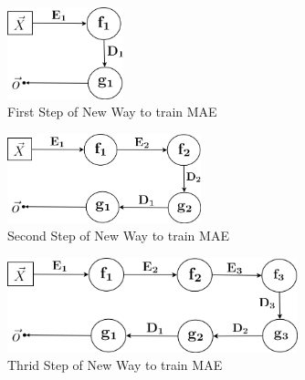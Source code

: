 \documentclass[draft,dvipsnames]{drexel-thesis}
\begin{document}
\begin{thesis}
\begin{figure}[t!]
    \centering
    \includegraphics[width=0.3\textwidth]{pictures/figures/train_new_MAE1.png}
    \caption{First Step of New Way to train MAE}
    \label{fig:train_NMAE1}
\end{figure}

\begin{figure}[t!]
    \centering
    \includegraphics[width=0.5\textwidth]{pictures/figures/train_new_MAE2.png}
    \caption{Second Step of New Way to train MAE}
    \label{fig:train_NMAE2}
\end{figure}

\begin{figure}[t!]
    \centering
    \includegraphics[width=0.75\textwidth]{pictures/figures/train_new_MAE3.png}
    \caption{Thrid Step of New Way to train MAE}
    \label{fig:train_NMAE3}
\end{figure}




\end{thesis}


\end{document}
